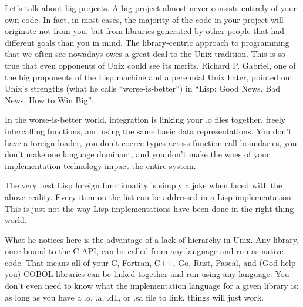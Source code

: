 \documentclass[12pt]{article}
\begin{document}
Let's talk about big projects. A big project almost never consists entirely of
your own code. In fact, in most cases, the majority of the code in your project
will originate not from you, but from libraries generated by other people that
had different goals than you in mind. The library-centric approach to
programming that we often see nowadays owes a great deal to the Unix tradition.
This is so true that even opponents of Unix could see its merits. Richard P.
Gabriel, one of the big proponents of the Lisp machine and a perennial Unix
hater, pointed out Unix's strengths (what he calls ``worse-is-better'') in
``Lisp: Good News, Bad News, How to Win Big'':

\begin{displayquote}
In the worse-is-better world, integration is linking your .o files together,
freely intercalling functions, and using the same basic data representations.
You don’t have a foreign loader, you don’t coerce types across function-call
boundaries, you don’t make one language dominant, and you don’t make the woes
of your implementation technology impact the entire system.

The very best Lisp foreign functionality is simply a joke when faced with the
above reality. Every item on the list can be addressed in a Lisp
implementation. This is just not the way Lisp implementations have been done in
the right thing world.
\end{displayquote}

What he notices here is the advantage of a lack of hierarchy in Unix. Any
library, once bound to the C API, can be called from any language and run as
native code. That means all of your C, Fortran, C++, Go, Rust, Pascal, and (God help
you) COBOL libraries can be linked together and run using any language.  You
don't even need to know what the implementation language for a given library
is: as long as you have a .o, .a, .dll, or .sa file to link, things will just work.
\end{document}
